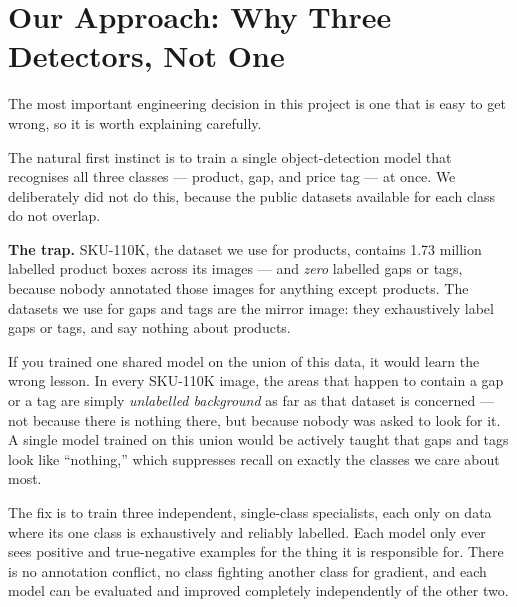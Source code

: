\documentclass[11pt,a4paper]{article}
\begin{document}
\section{Our Approach: Why Three Detectors, Not One}

The most important engineering decision in this project is one that is easy to get wrong, so it
is worth explaining carefully.

The natural first instinct is to train a single object-detection model that recognises all three
classes --- product, gap, and price tag --- at once. We deliberately did not do this, because the
public datasets available for each class do not overlap.

\begin{notebox}
\textbf{The trap.} SKU-110K, the dataset we use for products, contains 1.73 million labelled
product boxes across its images --- and \emph{zero} labelled gaps or tags, because nobody
annotated those images for anything except products. The datasets we use for gaps and tags are
the mirror image: they exhaustively label gaps or tags, and say nothing about products.

If you trained one shared model on the union of this data, it would learn the wrong lesson.
In every SKU-110K image, the areas that happen to contain a gap or a tag are simply
\emph{unlabelled background} as far as that dataset is concerned --- not because there is
nothing there, but because nobody was asked to look for it. A single model trained on this union
would be actively taught that gaps and tags look like ``nothing,'' which suppresses recall on
exactly the classes we care about most.
\end{notebox}

The fix is to train three independent, single-class specialists, each only on data where its one
class is exhaustively and reliably labelled. Each model only ever sees positive and true-negative
examples for the thing it is responsible for. There is no annotation conflict, no class fighting
another class for gradient, and each model can be evaluated and improved completely
independently of the other two.
\end{document}
